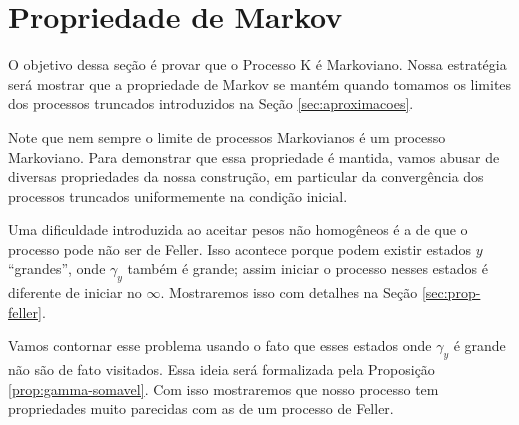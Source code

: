 
\section{Propriedade de Markov}
\label{sec:prop-markov}

O objetivo dessa seção é provar que o Processo K é Markoviano. Nossa
estratégia será mostrar que a propriedade de Markov se mantém quando
tomamos os limites dos processos truncados introduzidos na Seção
\ref{sec:aproximacoes}.

Note que nem sempre o limite de processos Markovianos é um processo
Markoviano. Para demonstrar que essa propriedade é mantida, vamos
abusar de diversas propriedades da nossa construção, em particular da
convergência dos processos truncados uniformemente na condição
inicial.

Uma dificuldade introduzida ao aceitar pesos não homogêneos é a de que
o processo pode não ser de Feller. Isso acontece porque podem existir
estados $y$ ``grandes'', onde $\gamma_y$ também é grande; assim
iniciar o processo nesses estados é diferente de iniciar no
$\infty$. Mostraremos isso com detalhes na Seção
\ref{sec:prop-feller}.

Vamos contornar esse problema usando o fato que esses estados onde
$\gamma_y$ é grande não são de fato visitados. Essa ideia será
formalizada pela Proposição \ref{prop:gamma-somavel}. Com isso
mostraremos que nosso processo tem propriedades muito parecidas com as
de um processo de Feller.

